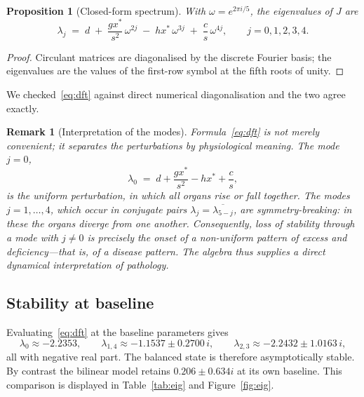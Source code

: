 \documentclass[11pt]{article}
\newtheorem{proposition}[theorem]{Proposition}
\newtheorem{remark}[theorem]{Remark}
\begin{document}
\begin{proposition}[Closed-form spectrum]\label{prop:dft}
With $\omega=e^{2\pi i/5}$, the eigenvalues of $J$ are
\begin{equation}\label{eq:dft}
\lambda_j \;=\; d \;+\; \frac{g x^\ast}{s^2}\,\omega^{2j}
\;-\; h x^\ast\,\omega^{3j}
\;+\; \frac{c}{s}\,\omega^{4j},
\qquad j=0,1,2,3,4 .
\end{equation}
\end{proposition}

\begin{proof}
Circulant matrices are diagonalised by the discrete Fourier basis; the
eigenvalues are the values of the first-row symbol at the fifth roots of unity.
\end{proof}

We checked~\eqref{eq:dft} against direct numerical diagonalisation and the two
agree exactly.

\begin{remark}[Interpretation of the modes]\label{rem:modes}
Formula~\eqref{eq:dft} is not merely convenient; it separates the perturbations
by physiological meaning. The mode $j=0$,
\[
\lambda_0 \;=\; d + \frac{g x^\ast}{s^2} - h x^\ast + \frac{c}{s},
\]
is the \emph{uniform} perturbation, in which all organs rise or fall together.
The modes $j=1,\dots,4$, which occur in conjugate pairs
$\lambda_j=\overline{\lambda_{5-j}}$, are \emph{symmetry-breaking}: in these the
organs diverge from one another. Consequently, loss of stability through a mode
with $j\neq0$ is precisely the onset of a non-uniform pattern of excess and
deficiency---that is, of a \emph{disease pattern}. The algebra thus supplies a
direct dynamical interpretation of pathology.
\end{remark}

\subsection{Stability at baseline}

Evaluating~\eqref{eq:dft} at the baseline parameters gives
\[
\lambda_0 \approx -2.2353,\qquad
\lambda_{1,4}\approx -1.1537 \pm 0.2700\,i,\qquad
\lambda_{2,3}\approx -2.2432 \pm 1.0163\,i,
\]
all with negative real part. The balanced state is therefore asymptotically
stable. By contrast the bilinear model retains $0.206\pm0.634i$ at its own
baseline. This comparison is displayed in Table~\ref{tab:eig} and
Figure~\ref{fig:eig}.
\end{document}
